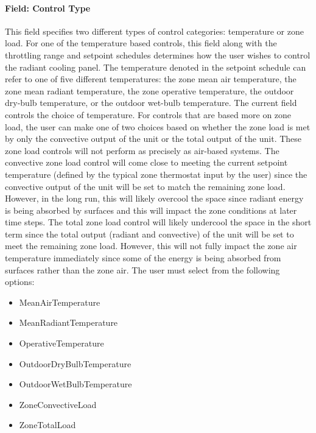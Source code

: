 \paragraph{Field: Control Type}\label{field-control-type}

This field specifies two different types of control categories: temperature or zone load.  For one of the temperature based controls, this field along with the throttling range and setpoint schedules determines how the user wishes to control the radiant cooling panel.  The temperature denoted in the setpoint schedule can refer to one of five different temperatures: the zone mean air temperature, the zone mean radiant temperature, the zone operative temperature, the outdoor dry-bulb temperature, or the outdoor wet-bulb temperature.  The current field controls the choice of temperature.  For controls that are based more on zone load, the user can make one of two choices based on whether the zone load is met by only the convective output of the unit or the total output of the unit.  These zone load controls will not perform as precisely as air-based systems.  The convective zone load control will come close to meeting the current setpoint temperature (defined by the typical zone thermostat input by the user) since the convective output of the unit will be set to match the remaining zone load.  However, in the long run, this will likely overcool the space since radiant energy is being absorbed by surfaces and this will impact the zone conditions at later time steps.  The total zone load control will likely undercool the space in the short term since the total output (radiant and convective) of the unit will be set to meet the remaining zone load.  However, this will not fully impact the zone air temperature immediately since some of the energy is being absorbed from surfaces rather than the zone air.  The user must select from the following options:

\begin{itemize}
\tightlist
\item
  MeanAirTemperature
\item
  MeanRadiantTemperature
\item
  OperativeTemperature
\item
  OutdoorDryBulbTemperature
\item
  OutdoorWetBulbTemperature
\item
  ZoneConvectiveLoad
\item
  ZoneTotalLoad
\end{itemize}

